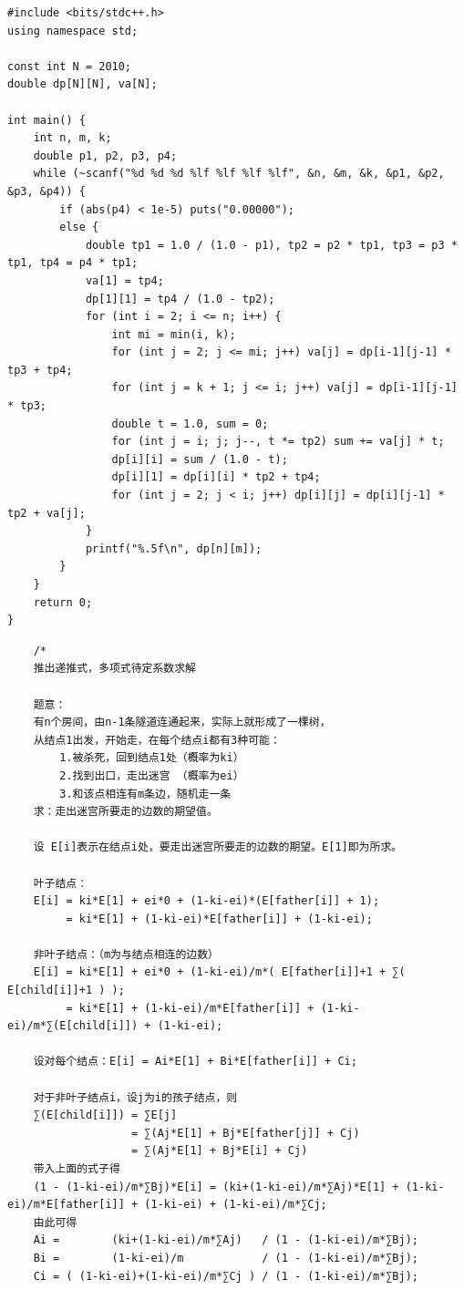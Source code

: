 \documentclass[10pt]{ctexart}
\begin{document}
{\begin{lstlisting}
#include <bits/stdc++.h>
using namespace std;

const int N = 2010;
double dp[N][N], va[N];

int main() {
    int n, m, k;
    double p1, p2, p3, p4;
    while (~scanf("%d %d %d %lf %lf %lf %lf", &n, &m, &k, &p1, &p2, &p3, &p4)) {
        if (abs(p4) < 1e-5) puts("0.00000");
        else {
            double tp1 = 1.0 / (1.0 - p1), tp2 = p2 * tp1, tp3 = p3 * tp1, tp4 = p4 * tp1;
            va[1] = tp4;
            dp[1][1] = tp4 / (1.0 - tp2);
            for (int i = 2; i <= n; i++) {
                int mi = min(i, k);
                for (int j = 2; j <= mi; j++) va[j] = dp[i-1][j-1] * tp3 + tp4;
                for (int j = k + 1; j <= i; j++) va[j] = dp[i-1][j-1] * tp3;
                double t = 1.0, sum = 0;
                for (int j = i; j; j--, t *= tp2) sum += va[j] * t;
                dp[i][i] = sum / (1.0 - t);
                dp[i][1] = dp[i][i] * tp2 + tp4;
                for (int j = 2; j < i; j++) dp[i][j] = dp[i][j-1] * tp2 + va[j];
            }
            printf("%.5f\n", dp[n][m]);
        }
    }
    return 0;
}
\end{lstlisting}

\begin{lstlisting}
    /*
    推出递推式，多项式待定系数求解
    
    题意：
    有n个房间，由n-1条隧道连通起来，实际上就形成了一棵树，
    从结点1出发，开始走，在每个结点i都有3种可能：
        1.被杀死，回到结点1处（概率为ki）
        2.找到出口，走出迷宫 （概率为ei）
        3.和该点相连有m条边，随机走一条
    求：走出迷宫所要走的边数的期望值。

    设 E[i]表示在结点i处，要走出迷宫所要走的边数的期望。E[1]即为所求。

    叶子结点：
    E[i] = ki*E[1] + ei*0 + (1-ki-ei)*(E[father[i]] + 1);
         = ki*E[1] + (1-ki-ei)*E[father[i]] + (1-ki-ei);

    非叶子结点：（m为与结点相连的边数）
    E[i] = ki*E[1] + ei*0 + (1-ki-ei)/m*( E[father[i]]+1 + ∑( E[child[i]]+1 ) );
         = ki*E[1] + (1-ki-ei)/m*E[father[i]] + (1-ki-ei)/m*∑(E[child[i]]) + (1-ki-ei);

    设对每个结点：E[i] = Ai*E[1] + Bi*E[father[i]] + Ci;

    对于非叶子结点i，设j为i的孩子结点，则
    ∑(E[child[i]]) = ∑E[j]
                   = ∑(Aj*E[1] + Bj*E[father[j]] + Cj)
                   = ∑(Aj*E[1] + Bj*E[i] + Cj)
    带入上面的式子得
    (1 - (1-ki-ei)/m*∑Bj)*E[i] = (ki+(1-ki-ei)/m*∑Aj)*E[1] + (1-ki-ei)/m*E[father[i]] + (1-ki-ei) + (1-ki-ei)/m*∑Cj;
    由此可得
    Ai =        (ki+(1-ki-ei)/m*∑Aj)   / (1 - (1-ki-ei)/m*∑Bj);
    Bi =        (1-ki-ei)/m            / (1 - (1-ki-ei)/m*∑Bj);
    Ci = ( (1-ki-ei)+(1-ki-ei)/m*∑Cj ) / (1 - (1-ki-ei)/m*∑Bj);


\end{lstlisting}}
\end{document}
